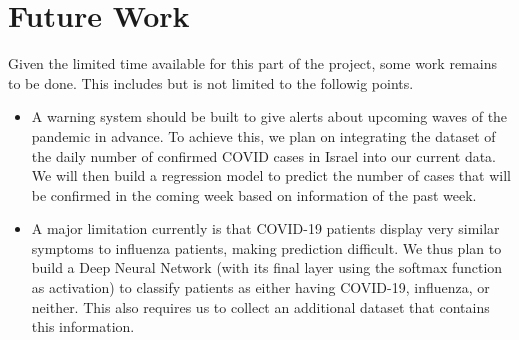 \documentclass[a4paper]{article}
\begin{document}
\section*{Future Work}
Given the limited time available for this part of the project, some work remains to be done. This includes but is not limited to the followig points.
\begin{itemize}
  \item A warning system should be built to give alerts about upcoming waves of the pandemic in advance. To achieve this, we plan on integrating the dataset of the daily number of confirmed COVID cases in Israel into our current data. We will then build a regression model to predict the number of cases that will be confirmed in the coming week based on information of the past week.
  \item A major limitation currently is that COVID-19 patients display very similar symptoms to influenza patients, making prediction difficult. We thus plan to build a Deep Neural Network (with its final layer using the softmax function as activation) to classify patients as either having COVID-19, influenza, or neither. This also requires us to collect an additional dataset that contains this information.
\end{itemize}

\printbibliography
\end{document}
